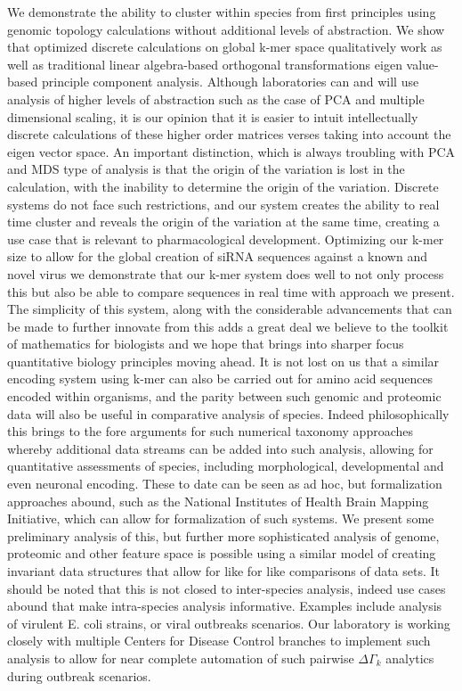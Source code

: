 \documentclass[12pt]{article}
\newcommand{\kmer}{k-mer\xspace}
\begin{document}
We demonstrate the ability to cluster within species from first principles using genomic topology calculations without additional levels of abstraction. We show that optimized discrete calculations on global k-mer space qualitatively work as well as traditional linear algebra-based orthogonal transformations eigen value-based principle component analysis. Although laboratories can and will use analysis of higher levels of abstraction such as the case of PCA and multiple dimensional scaling, it is our opinion that it is easier to intuit intellectually discrete calculations of these higher order matrices verses taking into account the eigen vector space. An important distinction, which is always troubling with PCA and MDS type of analysis is that the origin of the variation is lost in the calculation, with the inability to determine the origin of the variation. Discrete systems do not face such restrictions, and our system creates the ability to real time cluster and reveals the origin of the variation at the same time, creating a use case that is relevant to pharmacological development. Optimizing our k-mer size to allow for the global creation of siRNA sequences against a known and novel virus we demonstrate that our k-mer system does well to not only process this but also be able to compare sequences in real time with approach we present. The simplicity of this system, along with the considerable advancements that can be made to further innovate from this adds a great deal we believe to the toolkit of mathematics for biologists and we hope that brings into sharper focus quantitative biology principles moving ahead. It is not lost on us that a similar encoding system using \kmer can also be carried out for amino acid sequences encoded within organisms, and the parity between such genomic and proteomic data will also be useful in comparative analysis of species. Indeed philosophically this brings to the fore arguments for such numerical taxonomy approaches whereby additional data streams can be added into such analysis, allowing for quantitative assessments of species, including morphological, developmental and even neuronal encoding. These to date can be seen as ad hoc, but formalization approaches abound, such as the National Institutes of Health Brain Mapping Initiative, which can allow for formalization of such systems. We present some preliminary analysis of this, but further more sophisticated analysis of genome, proteomic and other feature space is possible using a similar model of creating invariant data structures that allow for like for like comparisons of data sets. It should be noted that this is not closed to inter-species analysis, indeed use cases abound that make intra-species analysis informative. Examples include analysis of virulent E. coli strains, or viral outbreaks scenarios. Our laboratory is working closely with multiple Centers for Disease Control branches to implement such analysis to allow for near complete automation of such pairwise $\Delta {\Gamma _k}$ analytics during outbreak scenarios. \\ 
\end{document}
